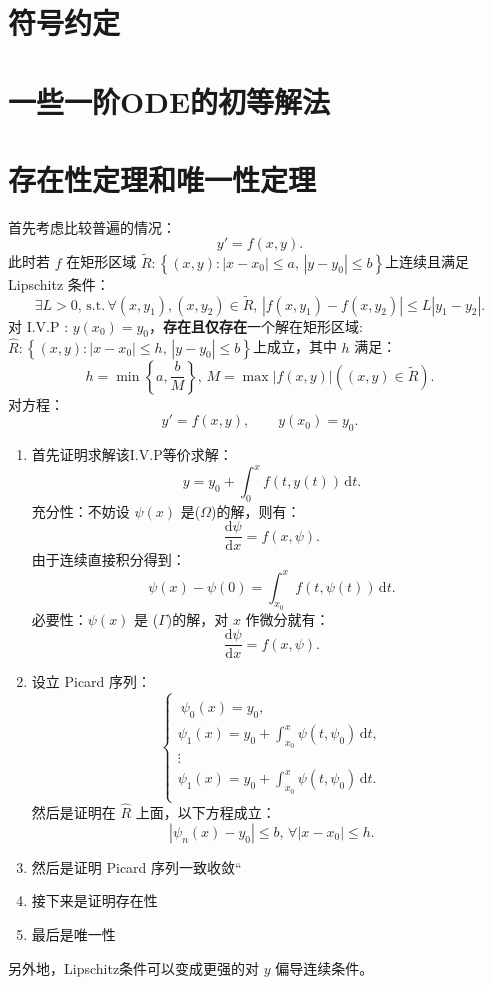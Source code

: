 \documentclass{ctexart}
\begin{document}
\setcounter{section}{-1}
\section{符号约定}
\section{一些一阶ODE的初等解法}
\section{存在性定理和唯一性定理}
首先考虑比较普遍的情况：
\[
	y'=f(x,y)
	.\]
此时若 \(f\) 在矩形区域 \(\widetilde{R}:\left\{ (x,y):\left| x-x_0 \right| \leqslant a,\, \left\vert y-y_0 \right\vert \leqslant b \right\} \)上连续且满足 Lipschitz 条件：
\[
	\exists L>0,\, \mathrm{s.t.}\,\forall (x,y_1),(x,y_2)\in \widetilde{R},\,  \left| f(x,y_1)-f(x,y_2) \right|\leqslant L \left\vert y_1-y_2 \right\vert
	.\]
对 I.V.P : \(y(x_0)=y_0\)，\textbf{存在且仅存在}一个解在矩形区域: \(\hat{R}:\left\{ (x,y):\left| x-x_0 \right| \leqslant h,\, \left\vert y-y_0 \right\vert \leqslant b \right\}\)上成立，其中 \(h\) 满足：
\[
	h=\min\left\{ a,\frac{b}{M} \right\} ,\,M=\max\left| f(x,y) \right| \left( (x,y)\in \widetilde{R} \right)
	.\]
对方程：
\[
	y'=f(x,y),\qquad y(x_0)=y_0 \tag{\(\Omega \)}
	.\]
\begin{enumerate}
	\item 首先证明求解该I.V.P等价求解：
	      \[
		      y=y_0+\int_0^x f(t,y(t)) \,\mathrm{d}t \tag{\(\Gamma \)}
		      .\]
	      充分性：不妨设 \(\psi (x)\) 是(\(\Omega \))的解，则有：
	      \[
		      \frac{\mathrm{d}\psi }{\mathrm{d}x}=f(x,\psi )
		      .\]
	      由于连续直接积分得到：
	      \[
		      \psi (x)-\psi (0)=\int_{x_0}^x f(t,\psi (t)) \,\mathrm{d}t
		      .\]
	      必要性：\(\psi (x)\) 是 (\(\Gamma  \))的解，对 \(x\) 作微分就有：
	      \[
		      \frac{\mathrm{d}\psi }{\mathrm{d}x}=f(x,\psi )
		      .\]
	      \rightline{\(\blacksquare\)}
	\item 设立 Picard 序列：
	      \[
		      \begin{cases}
			      \\[-2.2em]\
			      \psi_0(x)=y_0 ,                                             \\
			      \psi _1(x)=y_0+\int_{x_0}^x \psi (t,\psi _0) \,\mathrm{d}t, \\
			      \vdots                                                      \\
			      \psi _1(x)=y_0+\int_{x_0}^x \psi (t,\psi _0) \,\mathrm{d}t. \\
		      \end{cases}
	      \]
	      然后是证明在 \(\hat{R}\) 上面，以下方程成立：
	      \[
		      \left\vert  \psi_n(x)-y_0 \right\vert \leqslant b,\,\forall \left\vert x-x_0 \right\vert \leqslant h
		      .\]
	\item 然后是证明 Picard 序列一致收敛“
	\item 接下来是证明存在性
	\item 最后是唯一性
\end{enumerate}
另外地，Lipschitz条件可以变成更强的对 \(y\) 偏导连续条件。
\end{document}
